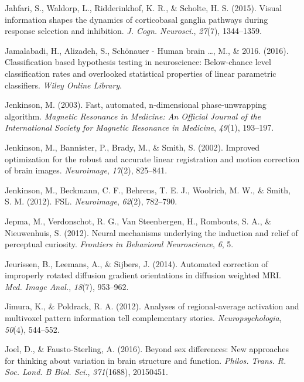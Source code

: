 \documentclass[12pt,american,a4paper,oneside,]{memoir} %
\begin{document}
\leavevmode\hypertarget{ref-Jahfari2015-ix}{}%
Jahfari, S., Waldorp, L., Ridderinkhof, K. R., \& Scholte, H. S. (2015). Visual information shapes the dynamics of corticobasal ganglia pathways during response selection and inhibition. \emph{J. Cogn. Neurosci.}, \emph{27}(7), 1344--1359.

\leavevmode\hypertarget{ref-Jamalabadi2016-gr}{}%
Jamalabadi, H., Alizadeh, S., Schönauer - Human brain \ldots, M., \& 2016. (2016). Classification based hypothesis testing in neuroscience: Below‐chance level classification rates and overlooked statistical properties of linear parametric classifiers. \emph{Wiley Online Library}.

\leavevmode\hypertarget{ref-jenkinson2003fast}{}%
Jenkinson, M. (2003). Fast, automated, n-dimensional phase-unwrapping algorithm. \emph{Magnetic Resonance in Medicine: An Official Journal of the International Society for Magnetic Resonance in Medicine}, \emph{49}(1), 193--197.

\leavevmode\hypertarget{ref-Jenkinson2002-wm}{}%
Jenkinson, M., Bannister, P., Brady, M., \& Smith, S. (2002). Improved optimization for the robust and accurate linear registration and motion correction of brain images. \emph{Neuroimage}, \emph{17}(2), 825--841.

\leavevmode\hypertarget{ref-Jenkinson2012-ui}{}%
Jenkinson, M., Beckmann, C. F., Behrens, T. E. J., Woolrich, M. W., \& Smith, S. M. (2012). FSL. \emph{Neuroimage}, \emph{62}(2), 782--790.

\leavevmode\hypertarget{ref-jepma2012neural}{}%
Jepma, M., Verdonschot, R. G., Van Steenbergen, H., Rombouts, S. A., \& Nieuwenhuis, S. (2012). Neural mechanisms underlying the induction and relief of perceptual curiosity. \emph{Frontiers in Behavioral Neuroscience}, \emph{6}, 5.

\leavevmode\hypertarget{ref-Jeurissen2014-cd}{}%
Jeurissen, B., Leemans, A., \& Sijbers, J. (2014). Automated correction of improperly rotated diffusion gradient orientations in diffusion weighted MRI. \emph{Med. Image Anal.}, \emph{18}(7), 953--962.

\leavevmode\hypertarget{ref-Jimura2012-lv}{}%
Jimura, K., \& Poldrack, R. A. (2012). Analyses of regional-average activation and multivoxel pattern information tell complementary stories. \emph{Neuropsychologia}, \emph{50}(4), 544--552.

\leavevmode\hypertarget{ref-Joel2016-uo}{}%
Joel, D., \& Fausto-Sterling, A. (2016). Beyond sex differences: New approaches for thinking about variation in brain structure and function. \emph{Philos. Trans. R. Soc. Lond. B Biol. Sci.}, \emph{371}(1688), 20150451.
\end{document}
